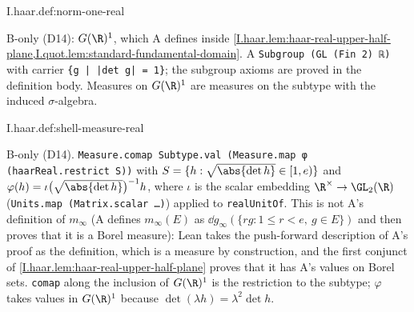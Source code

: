 \begin{definition}
\bonly
{}
\end{definition}
\begin{tfformal}{I.haar.def:norm-one-real}
\begin{tffidelity}
B-only (D14): $G(\R)^1$, which A defines inside \cref{I.haar.lem:haar-real-upper-half-plane,I.quot.lem:standard-fundamental-domain}. A \texttt{Subgroup (GL (Fin 2) ℝ)} with carrier \texttt{\{g | |det g| = 1\}}; the subgroup axioms are proved in the definition body. Measures on $G(\R)^1$ are measures on the subtype with the induced $\sigma$-algebra.
\end{tffidelity}
\end{tfformal}

\begin{definition}
\bonly
{}
\end{definition}
\begin{tfformal}{I.haar.def:shell-measure-real}
\begin{tffidelity}
B-only (D14). \texttt{Measure.comap Subtype.val (Measure.map φ (haarReal.restrict S))} with $S=\{h:\sqrt{\abs{\det h}}\in[1,e)\}$ and $\varphi(h)=\iota\bigl(\sqrt{\abs{\det h}}\bigr)^{-1}h$, where $\iota$ is the scalar embedding $\R^\times\to\GL_2(\R)$ (\texttt{Units.map (Matrix.scalar …)}) applied to \texttt{realUnitOf}. This is not A's definition of $m_\infty$ (A defines $m_\infty(E)$ as $\dd g_\infty(\{rg:1\le r<e,\ g\in E\})$ and then proves that it is a Borel measure): Lean takes the push-forward description of A's proof as the definition, which is a measure by construction, and the first conjunct of \cref{I.haar.lem:haar-real-upper-half-plane} proves that it has A's values on Borel sets. \texttt{comap} along the inclusion of $G(\R)^1$ is the restriction to the subtype; $\varphi$ takes values in $G(\R)^1$ because $\det(\lambda h)=\lambda^2\det h$.
\end{tffidelity}
\end{tfformal}


